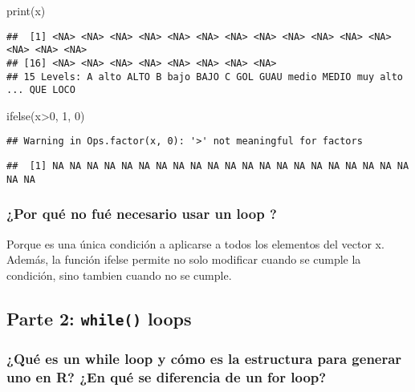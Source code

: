 \documentclass[
]{article}
\newenvironment{Shaded}{\begin{snugshade}}{\end{snugshade}}
\newcommand{\DecValTok}[1]{\textcolor[rgb]{0.00,0.00,0.81}{#1}}
\newcommand{\FunctionTok}[1]{\textcolor[rgb]{0.00,0.00,0.00}{#1}}
\newcommand{\NormalTok}[1]{#1}
\newcommand{\SpecialCharTok}[1]{\textcolor[rgb]{0.00,0.00,0.00}{#1}}
\begin{document}
\begin{Shaded}
\begin{Highlighting}[]
\FunctionTok{print}\NormalTok{(x)}
\end{Highlighting}
\end{Shaded}

\begin{verbatim}
##  [1] <NA> <NA> <NA> <NA> <NA> <NA> <NA> <NA> <NA> <NA> <NA> <NA> <NA> <NA> <NA>
## [16] <NA> <NA> <NA> <NA> <NA> <NA> <NA> <NA>
## 15 Levels: A alto ALTO B bajo BAJO C GOL GUAU medio MEDIO muy alto ... QUE LOCO
\end{verbatim}

\begin{Shaded}
\begin{Highlighting}[]
\FunctionTok{ifelse}\NormalTok{(x}\SpecialCharTok{\textgreater{}}\DecValTok{0}\NormalTok{, }\DecValTok{1}\NormalTok{, }\DecValTok{0}\NormalTok{)}
\end{Highlighting}
\end{Shaded}

\begin{verbatim}
## Warning in Ops.factor(x, 0): '>' not meaningful for factors
\end{verbatim}

\begin{verbatim}
##  [1] NA NA NA NA NA NA NA NA NA NA NA NA NA NA NA NA NA NA NA NA NA NA NA
\end{verbatim}

\hypertarget{por-quuxe9-no-fuuxe9-necesario-usar-un-loop}{%
\subsubsection{¿Por qué no fué necesario usar un loop
?}\label{por-quuxe9-no-fuuxe9-necesario-usar-un-loop}}

Porque es una única condición a aplicarse a todos los elementos del
vector x. Además, la función ifelse permite no solo modificar cuando se
cumple la condición, sino tambien cuando no se cumple.

\hypertarget{parte-2-while-loops}{%
\subsection{\texorpdfstring{Parte 2: \texttt{while()}
loops}{Parte 2: while() loops}}\label{parte-2-while-loops}}

\hypertarget{quuxe9-es-un-while-loop-y-cuxf3mo-es-la-estructura-para-generar-uno-en-r-en-quuxe9-se-diferencia-de-un-for-loop}{%
\subsubsection{¿Qué es un while loop y cómo es la estructura para
generar uno en R? ¿En qué se diferencia de un for
loop?}\label{quuxe9-es-un-while-loop-y-cuxf3mo-es-la-estructura-para-generar-uno-en-r-en-quuxe9-se-diferencia-de-un-for-loop}}
\end{document}
